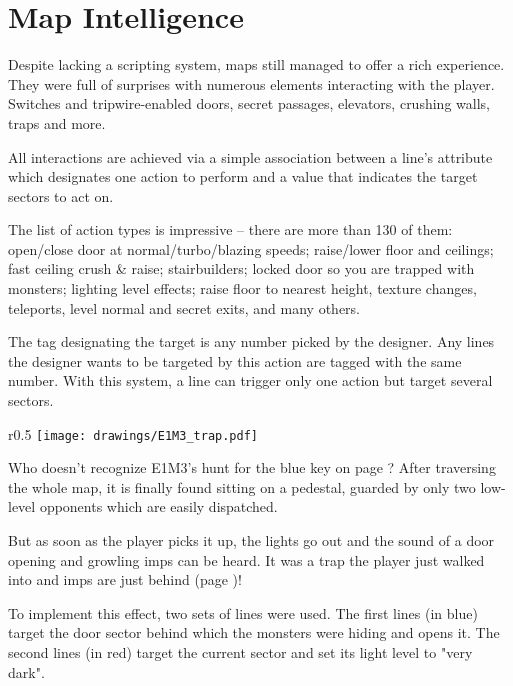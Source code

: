 \section{Map Intelligence}
Despite lacking a scripting system, maps still managed to offer a rich experience. They were full of surprises with numerous elements interacting with the player. Switches and tripwire-enabled doors, secret passages, elevators, crushing walls, traps and more.\\
\par
{}
\par
All interactions are achieved via a simple association between a line's  attribute which designates one action to perform and a  value that indicates the target sectors to act on.\\
\par
The list of action types is impressive -- there are more than 130 of them: open/close door at normal/turbo/blazing speeds; raise/lower floor and ceilings; fast ceiling crush \& raise; stairbuilders; locked door so you are trapped with monsters; lighting level effects; raise floor to nearest height, texture changes, teleports, level normal and secret exits, and many others.\\
\par
The tag designating the target is any number picked by the designer. Any lines the designer wants to be targeted by this action are tagged with the same number. With this system, a line can trigger only one action but target several sectors.\\
\par
{}
\pagebreak






\begin{wrapfigure}[17]{r}{0.5\textwidth}
\centering
\texttt{[image: drawings/E1M3\_trap.pdf]}
\end{wrapfigure}
Who doesn't recognize E1M3's hunt for the blue key on page \pageref{e1m3_trap}? After traversing the whole map, it is finally found sitting on a pedestal, guarded by only two low-level opponents which are easily dispatched.\\
\par
But as soon as the player picks it up, the lights go out and the sound of a door opening and growling imps can be heard. It was a trap the player just walked into and imps are just behind (page \pageref{e1m3_trap})!\\
\par
To implement this effect, two sets of lines were used. The first lines (in blue) target the door sector behind which the monsters were hiding and opens it. The second lines (in red) target the current sector and set its light level to "very dark".\\
\par



